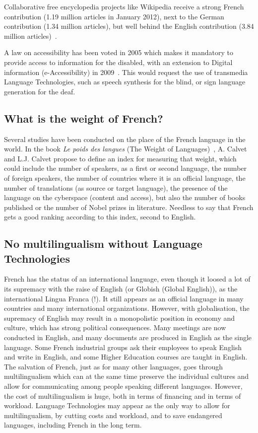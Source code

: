 \documentclass[]{../metanetpaper}
\begin{document}
\begin{multicols}{2}
Collaborative free encyclopedia projects like Wikipedia receive a
strong French contribution (1.19 million articles in January 2012),
next to the German contribution (1.34 million articles), but well behind the English contribution (3.84 million articles)~\cite{wikipediastats}.

A law on accessibility has been voted in 2005 which makes it mandatory
to provide access to information for the disabled, with an extension
to Digital information (e-Accessibility) in 2009~\cite{loi}. This would request
the use of transmedia Language Technologies, such as speech synthesis
for the blind, or sign language generation for the deaf.

\subsection{What is the weight of French?}

Several studies have been conducted on the place of the French
language in the world. In the book {\em Le poids des
langues} (The Weight of Languages)~\cite{calvet09}, A. Calvet and
L.J. Calvet propose to define an index for measuring that weight,
which could include the number of speakers, as a first or second
language, the number of foreign speakers, the number of countries
where it is an official language, the number of translations (as
source or target language), the presence of the language on the
cyberspace (content and access), but also the number of books
published or the number of Nobel prizes in literature. Needless to say
that French gets a good ranking according to this index, second to
English.

\subsection{No multilingualism without Language Technologies}

French has the status of an international language, even though it
loosed a lot of its supremacy with the raise of English (or Globish
(Global English)), as the international Lingua Franca (!). It still
appears as an official language in many countries and many
international organizations. However, with globalisation, the
supremacy of English may result in a monopolistic position in economy
and culture, which has strong political consequences. Many meetings
are now conducted in English, and many documents are produced in
English as the single language. Some French industrial groups ask
their employees to speak English and write in English, and some Higher
Education courses are taught in English. The salvation of French, just
as for many other languages, goes through multilingualism which can at
the same time preserve the individual cultures and allow for
communicating among people speaking different languages. However, the
cost of multilingualism is huge, both in terms of financing and in
terms of workload. Language Technologies may appear as the only way to
allow for multilingualism, by cutting costs and workload, and to save
endangered languages, including French in the long term.


\end{multicols}
\end{document}
